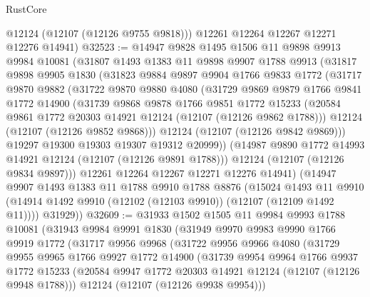 \begin{lexlean}{RustCore}
\begin{coremodule}
        @12124
        (@12107 (@12126 @9755 @9818)))
      @12261
      @12264
      @12267
      @12271
      @12276
      @14941)
@32523 := @14947
    @9828
    @1495
    @1506
    @11
    @9898
    @9913
    @9984
    @10081
    (@31807
      @1493
      @1383
      @11
      @9898
      @9907
      @1788
      @9913
      (@31817
        @9898
        @9905
        @1830
        (@31823
          @9884
          @9897
          @9904
          @1766
          @9833
          @1772
          (@31717
            @9870
            @9882
            (@31722
              @9870
              @9880
              @4080
              (@31729
                @9869
                @9879
                @1766
                @9841
                @1772
                @14900
                (@31739
                  @9868
                  @9878
                  @1766
                  @9851
                  @1772
                  @15233
                  (@20584 @9861 @1772 @20303 @14921 @12124 (@12107 (@12126 @9862 @1788)))
                  @12124
                  (@12107 (@12126 @9852 @9868)))
                @12124
                (@12107 (@12126 @9842 @9869)))
              @19297
              @19300
              @19303
              @19307
              @19312
              @20999))
          (@14987 @9890 @1772 @14993 @14921 @12124 (@12107 (@12126 @9891 @1788)))
          @12124
          (@12107 (@12126 @9834 @9897)))
        @12261
        @12264
        @12267
        @12271
        @12276
        @14941)
      (@14947
        @9907
        @1493
        @1383
        @11
        @1788
        @9910
        @1788
        @8876
        (@15024
          @1493
          @11
          @9910
          (@14914 @1492 @9910 (@12102 (@12103 @9910)) (@12107 (@12109 @1492 @11))))
        @31929))
@32609 := @31933
    @1502
    @1505
    @11
    @9984
    @9993
    @1788
    @10081
    (@31943
      @9984
      @9991
      @1830
      (@31949
        @9970
        @9983
        @9990
        @1766
        @9919
        @1772
        (@31717
          @9956
          @9968
          (@31722
            @9956
            @9966
            @4080
            (@31729
              @9955
              @9965
              @1766
              @9927
              @1772
              @14900
              (@31739
                @9954
                @9964
                @1766
                @9937
                @1772
                @15233
                (@20584 @9947 @1772 @20303 @14921 @12124 (@12107 (@12126 @9948 @1788)))
                @12124
                (@12107 (@12126 @9938 @9954)))

\end{coremodule}
\end{lexlean}
